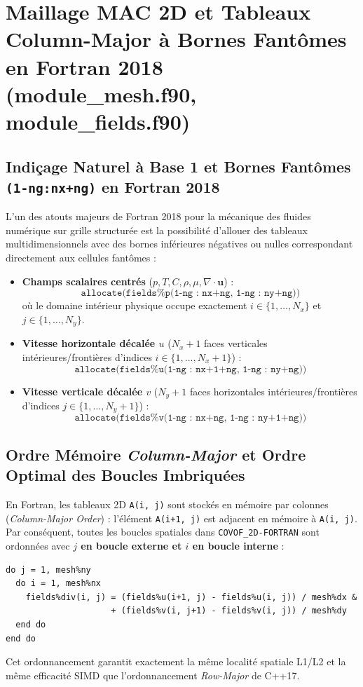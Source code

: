 \documentclass[10pt,a4paper,oneside]{book}
\begin{document}
\chapter{Maillage MAC 2D et Tableaux Column-Major à Bornes Fantômes en Fortran 2018 (module_mesh.f90, module_fields.f90)}
\section{Indiçage Naturel à Base 1 et Bornes Fantômes \texttt{(1-ng:nx+ng)} en Fortran 2018}
L'un des atouts majeurs de Fortran 2018 pour la mécanique des fluides numérique sur grille structurée est la possibilité d'allouer des tableaux multidimensionnels avec des bornes inférieures négatives ou nulles correspondant directement aux cellules fantômes :
\begin{itemize}
  \item \textbf{Champs scalaires centrés} ($p, T, C, \rho, \mu, \nabla\cdot\mathbf{u}$) :
  \begin{equation}
    \texttt{allocate(fields\%p(1-ng : nx+ng, 1-ng : ny+ng))}
  \end{equation}
  où le domaine intérieur physique occupe exactement $i \in \{1, \dots, N_x\}$ et $j \in \{1, \dots, N_y\}$.
  \item \textbf{Vitesse horizontale décalée $u$} ($N_x+1$ faces verticales intérieures/frontières d'indices $i \in \{1, \dots, N_x+1\}$) :
  \begin{equation}
    \texttt{allocate(fields\%u(1-ng : nx+1+ng, 1-ng : ny+ng))}
  \end{equation}
  \item \textbf{Vitesse verticale décalée $v$} ($N_y+1$ faces horizontales intérieures/frontières d'indices $j \in \{1, \dots, N_y+1\}$) :
  \begin{equation}
    \texttt{allocate(fields\%v(1-ng : nx+ng, 1-ng : ny+1+ng))}
  \end{equation}
\end{itemize}

\section{Ordre Mémoire \emph{Column-Major} et Ordre Optimal des Boucles Imbriquées}
En Fortran, les tableaux 2D \texttt{A(i, j)} sont stockés en mémoire par colonnes (\emph{Column-Major Order}) : l'élément \texttt{A(i+1, j)} est adjacent en mémoire à \texttt{A(i, j)}. Par conséquent, toutes les boucles spatiales dans \texttt{COVOF\_2D-FORTRAN} sont ordonnées avec \textbf{$j$ en boucle externe et $i$ en boucle interne} :
\begin{verbatim}
do j = 1, mesh%ny
  do i = 1, mesh%nx
    fields%div(i, j) = (fields%u(i+1, j) - fields%u(i, j)) / mesh%dx &
                     + (fields%v(i, j+1) - fields%v(i, j)) / mesh%dy
  end do
end do
\end{verbatim}
Cet ordonnancement garantit exactement la même localité spatiale L1/L2 et la même efficacité SIMD que l'ordonnancement \emph{Row-Major} de C++17.
\end{document}
